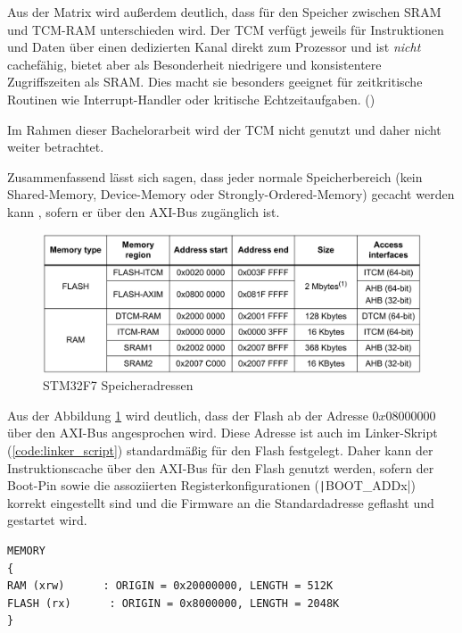 Aus der Matrix wird außerdem deutlich, dass für den Speicher zwischen SRAM und
\ac{TCM}-RAM unterschieden wird. Der TCM verfügt jeweils für Instruktionen und
Daten über einen dedizierten Kanal direkt zum Prozessor und ist \textit{nicht}
cachefähig, bietet aber als Besonderheit niedrigere und konsistentere
Zugriffszeiten als SRAM. Dies macht sie besonders geeignet für zeitkritische
Routinen wie Interrupt-Handler oder kritische Echtzeitaufgaben.
(\cite{arm_den0042})

Im Rahmen dieser Bachelorarbeit wird der TCM nicht genutzt und daher nicht
weiter betrachtet.

Zusammenfassend lässt sich sagen, dass jeder normale Speicherbereich (kein
Shared-Memory, Device-Memory oder Strongly-Ordered-Memory) gecacht werden kann
\cite[S. 7]{an4667}, sofern er über den AXI-Bus zugänglich ist.

\begin{figure}[htb]
    \centering
    \includegraphics[width=1\textwidth]{assets/internal_mem_table}
    \caption{STM32F7 Speicheradressen \cite[S. 14]{an4667}}
    \label{fig:internal_mem_table}
\end{figure}

Aus der Abbildung \ref{fig:internal_mem_table} wird deutlich, dass der Flash ab
der Adresse $0x0800 0000$ über den AXI-Bus angesprochen wird. Diese Adresse ist
auch im Linker-Skript (\ref{code:linker_script}) standardmäßig für den Flash
festgelegt. Daher kann der Instruktionscache über den AXI-Bus für den Flash
genutzt werden, sofern der Boot-Pin sowie die assoziierten
Registerkonfigurationen (\texttt|BOOT_ADDx|) korrekt eingestellt sind
\cite[S. 28]{stm32_datasheet} und die Firmware an die Standardadresse geflasht
und gestartet wird.

\begin{code}
\begin{verbatim}
MEMORY
{
RAM (xrw)      : ORIGIN = 0x20000000, LENGTH = 512K
FLASH (rx)      : ORIGIN = 0x8000000, LENGTH = 2048K
}
\end{verbatim}
    \label{code:linker_script}
\end{code}

